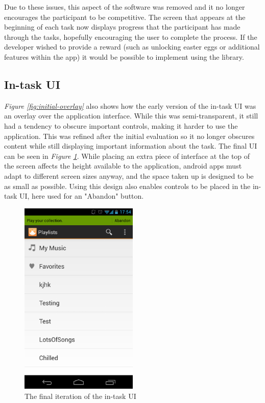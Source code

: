 Due to these issues, this aspect of the software was removed and it no longer encourages
the participant to be competitive. The screen that appears at the beginning of each task now displays
progress that the participant has made through the tasks, hopefully encouraging
the user to complete the process. If the developer wished to provide a reward (such as
unlocking easter eggs or additional features within the app) it would be possible to implement using
the library.

\subsection{In-task UI}

\emph{Figure \ref{fig:initial-overlay}} also shows how the early version of the in-task UI was an overlay over the application interface. While this was semi-transparent, it still had a tendency to obscure important controls, making it harder to use the application. This was refined after the initial evaluation so it no longer obscures content while still displaying important information about the task. The final UI can be seen in \emph{Figure \ref{fig:final-task-overlay}}. While placing an extra piece of interface at the top of the screen affects the height available to the application, android apps must adapt to different screen sizes anyway, and the space taken up is designed to be as small as possible. Using this design also enables controls to be placed in the in-task UI, here used for an "Abandon" button.

\begin{figure}[ht]
  \centering
  \includegraphics[width=0.5\textwidth]{images/new-in-task}
  \caption{The final iteration of the in-task UI}
  \label{fig:final-task-overlay}
\end{figure}

